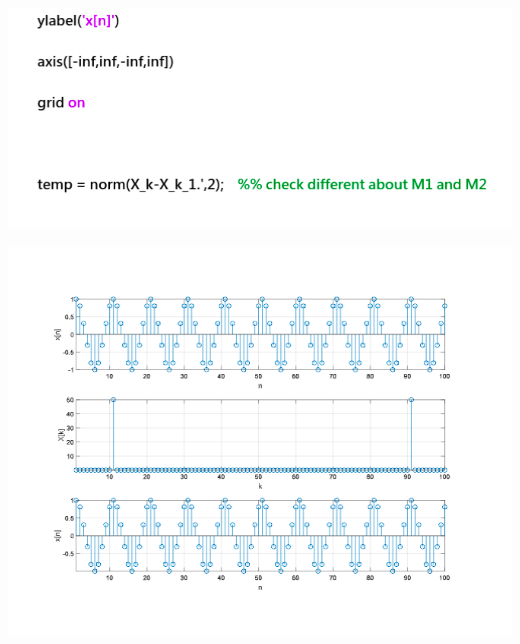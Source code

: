 \documentclass[a4paper]{article}
\begin{document}
	\begin{center}
		\includegraphics[width=1\linewidth]{screenshot090}
	\end{center}
	
	
\begin{center}
	\includegraphics[width=1\linewidth]{screenshot092}
\end{center}

\newpage

	
\end{document}
